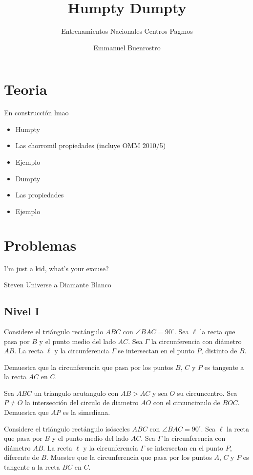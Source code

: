 \documentclass[11pt]{scrartcl}
\title {Humpty Dumpty}
\subtitle {Entrenamientos Nacionales Centros Pagmos}
\author{Emmanuel Buenrostro}
\begin{document}
\maketitle

\section{Teoria}
En construcción lmao
\begin{itemize}
    \item Humpty
    \item Las chorromil propiedades (incluye OMM 2010/5)
    \item Ejemplo 
    \item Dumpty
    \item Las propiedades 
    \item Ejemplo 
\end{itemize}

\section{Problemas }
\epigraph{I'm just a kid, what's your excuse?}{Steven Universe a Diamante Blanco}


\subsection{Nivel I}

\begin{problem}
    Considere el triángulo rectángulo $ABC$ con $\angle BAC = 90^\circ$. Sea $\ell$ la recta que pasa por $B$ y el punto medio del lado $AC$. Sea $\Gamma$ la circunferencia con diámetro $AB$. La recta $\ell$ y la circunferencia $\Gamma$ se intersectan en el punto $P$, distinto de $B$.

Demuestra que la circunferencia que pasa por los puntos $B$, $C$ y $P$ es tangente a la recta $AC$ en $C$.
\end{problem}

\begin{problem}
    Sea $ABC$ un triangulo acutangulo con $AB> AC$ y sea $O$ su circuncentro. Sea $P \neq O$ la intersección del circulo de diametro $AO$ con el circuncirculo de $BOC$. Demuestra que $AP$ es la simediana.
\end{problem}

\begin{problem} %
    
    Considere el triángulo rectángulo isósceles $ABC$ con $\angle BAC = 90^{\circ}$. Sea $\ell$ la recta que pasa por $B$ y el punto medio del lado $AC$. Sea $\Gamma$ la circunferencia con diámetro $AB$. La recta $\ell$ y la circunferencia $\Gamma$ se intersectan en el punto $P$, diferente de $B$. Muestre que la circunferencia que pasa por los puntos $A$, $C$ y $P$ es tangente a la recta $BC$ en $C$.
    
\end{problem}
\end{document}
